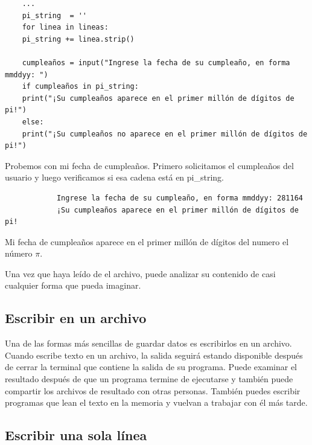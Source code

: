 \hspace{-2.5cm}{\ttfamily \scriptsize cumpleanos}

\vspace{-0.2cm}
\hspace{-2.5cm}{\ttfamily \scriptsize \_en\_pi\_.py}\vspace{-0.84cm}
\begin{lstlisting}
	...
	pi_string  = ''	
	for linea in lineas:
	pi_string += linea.strip()
	
	cumpleaños = input("Ingrese la fecha de su cumpleaño, en forma mmddyy: ")
	if cumpleaños in pi_string:
	print("¡Su cumpleaños aparece en el primer millón de dígitos de pi!")
	else:
	print("¡Su cumpleaños no aparece en el primer millón de dígitos de pi!")
\end{lstlisting}

Probemos con mi fecha de cumpleaños. Primero solicitamos el cumpleaños del usuario y luego verificamos si esa cadena está en {\ttfamily pi\_string}.

{\ttfamily\scriptsize\scriptsize 
	\hspace{-0.65cm} \vspace{-0.3cm}	
	{\color{blue} 	
		\begin{verbatim}
			Ingrese la fecha de su cumpleaño, en forma mmddyy: 281164
			¡Su cumpleaños aparece en el primer millón de dígitos de pi!		
		\end{verbatim}
}}

Mi fecha de cumpleaños aparece en el  primer millón de dígitos del numero el número $\pi$. 

Una vez que haya leído de el archivo, puede analizar su contenido de casi cualquier forma que pueda imaginar.


\subsection{Escribir en un archivo}

Una de las formas más sencillas de guardar datos es escribirlos en un archivo. Cuando escribe texto en un archivo, la salida seguirá estando disponible después de cerrar la terminal que contiene la salida de su programa. 
Puede examinar el resultado después de que un programa termine de ejecutarse y también puede compartir los archivos de resultado con otras personas.
También puedes escribir programas que lean el texto en la memoria y vuelvan a trabajar con él más tarde.

\subsection{Escribir una sola línea}

